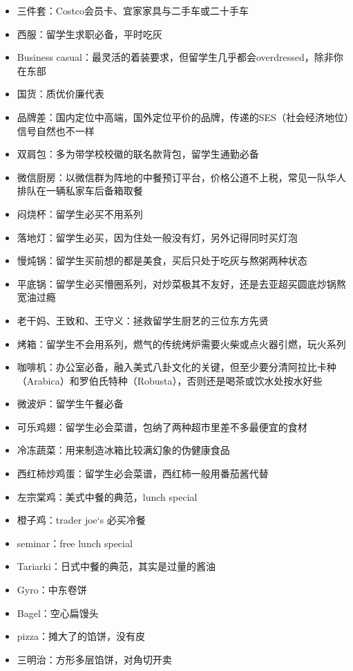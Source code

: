 \documentclass[]{tufte-book}
\providecommand{\tightlist}{%
  \setlength{\itemsep}{0pt}\setlength{\parskip}{0pt}}
\begin{document}
\begin{itemize}
\tightlist
\item
  三件套：Costco会员卡、宜家家具与二手车或二十手车
\item
  西服：留学生求职必备，平时吃灰
\item
  Business casual：最灵活的着装要求，但留学生几乎都会overdressed，除非你在东部
\item
  国货：质优价廉代表
\item
  品牌差：国内定位中高端，国外定位平价的品牌，传递的SES（社会经济地位）信号自然也不一样
\item
  双肩包：多为带学校校徽的联名款背包，留学生通勤必备
\item
  微信厨房：以微信群为阵地的中餐预订平台，价格公道不上税，常见一队华人排队在一辆私家车后备箱取餐
\item
  闷烧杯：留学生必买不用系列
\item
  落地灯：留学生必买，因为住处一般没有灯，另外记得同时买灯泡
\item
  慢炖锅：留学生买前想的都是美食，买后只处于吃灰与熬粥两种状态
\item
  平底锅：留学生必买懵圈系列，对炒菜极其不友好，还是去亚超买圆底炒锅熬宽油过瘾
\item
  老干妈、王致和、王守义：拯救留学生厨艺的三位东方先贤
\item
  烤箱：留学生不会用系列，燃气的传统烤炉需要火柴或点火器引燃，玩火系列
\item
  咖啡机：办公室必备，融入美式八卦文化的关键，但至少要分清阿拉比卡种（Arabica）和罗伯氏特种（Robusta），否则还是喝茶或饮水处按水好些
\item
  微波炉：留学生午餐必备
\item
  可乐鸡翅：留学生必会菜谱，包纳了两种超市里差不多最便宜的食材
\item
  冷冻蔬菜：用来制造冰箱比较满幻象的伪健康食品
\item
  西红柿炒鸡蛋：留学生必会菜谱，西红柿一般用番茄酱代替
\item
  左宗棠鸡：美式中餐的典范，lunch special
\item
  橙子鸡：trader joe`s 必买冷餐
\item
  seminar：free lunch special
\item
  Tariarki：日式中餐的典范，其实是过量的酱油
\item
  Gyro：中东卷饼
\item
  Bagel：空心扁馒头
\item
  pizza：摊大了的馅饼，没有皮
\item
  三明治：方形多层馅饼，对角切开卖

\end{itemize}
\end{document}
